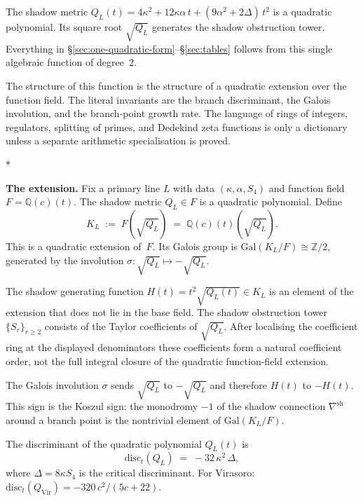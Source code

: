 \documentclass[11pt]{article}
\newcommand{\Z}{\mathbb{Z}}
\newcommand{\Q}{\mathbb{Q}}
\newcommand{\sep}{\bigskip\begin{center}$*$\end{center}\medskip}
\begin{document}
The shadow metric $Q_L(t) = 4\kappa^2 + 12\kappa\alpha\,t
+ (9\alpha^2 + 2\Delta)\,t^2$ is a quadratic polynomial.
Its square root $\sqrt{Q_L}$ generates the shadow obstruction tower.
Everything in \S\ref{sec:one-quadratic-form}--\S\ref{sec:tables}
follows from this single algebraic function of degree~$2$.

The structure of this function is the structure of a quadratic
extension over the function field.  The literal invariants are the
branch discriminant, the Galois involution, and the branch-point
growth rate.  The language of rings of integers, regulators,
splitting of primes, and Dedekind zeta functions is only a
dictionary unless a separate arithmetic specialisation is proved.

\sep

\noindent\textbf{The extension.}\enspace
Fix a primary line $L$ with data $(\kappa, \alpha, S_4)$ and
function field $F = \Q(c)(t)$.  The shadow metric
$Q_L \in F$ is a quadratic polynomial.  Define
\begin{equation}\label{eq:shadow-extension}
  K_L \;:=\; F(\sqrt{Q_L}) \;=\; \Q(c)(t)(\sqrt{Q_L}).
\end{equation}
This is a quadratic extension of~$F$.  Its Galois group is
$\mathrm{Gal}(K_L/F) \cong \Z/2$, generated by the involution
$\sigma\colon \sqrt{Q_L} \mapsto -\sqrt{Q_L}$.

The shadow generating function
$H(t) = t^2\sqrt{Q_L(t)} \in K_L$
is an element of the extension that does not lie in the base field.
The shadow obstruction tower $\{S_r\}_{r \geq 2}$ consists of the
Taylor coefficients of $\sqrt{Q_L}$.  After localising the
coefficient ring at the displayed denominators these coefficients
form a natural coefficient order, not the full integral closure of
the quadratic function-field extension.

The Galois involution $\sigma$ sends $\sqrt{Q_L}$ to $-\sqrt{Q_L}$
and therefore $H(t)$ to $-H(t)$.  This sign is the Koszul sign:
the monodromy $-1$ of the shadow connection $\nabla^{\mathrm{sh}}$
around a branch point is the nontrivial element of
$\mathrm{Gal}(K_L/F)$.

\begin{proposition}
\label{prop:shadow-discriminant}
The discriminant of the quadratic polynomial $Q_L(t)$ is
\begin{equation}\label{eq:shadow-field-discriminant}
  \mathrm{disc}_t(Q_L)
  \;=\;
  -32\,\kappa^2\,\Delta,
\end{equation}
where $\Delta = 8\kappa S_4$ is the critical discriminant.
For Virasoro:
$\mathrm{disc}_t(Q_{\mathrm{Vir}}) = -320\,c^2/(5c{+}22)$.
\end{proposition}
\end{document}
